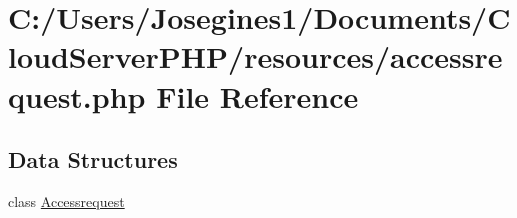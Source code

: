 \hypertarget{accessrequest_8php}{}\section{C\+:/\+Users/\+Josegines1/\+Documents/\+Cloud\+Server\+P\+H\+P/resources/accessrequest.php File Reference}
\label{accessrequest_8php}
\subsection*{Data Structures}
\begin{DoxyCompactItemize}
\item 
class \mbox{\hyperlink{class_accessrequest}{Accessrequest}}
\end{DoxyCompactItemize}
